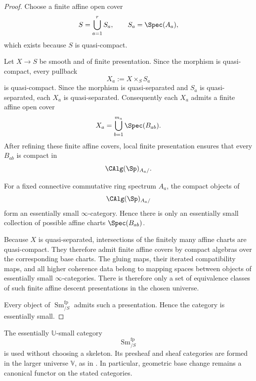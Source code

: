 \begin{proof}
Choose a finite affine open cover
\[
    S
    =
    \bigcup_{a=1}^r
    S_a,
    \qquad
    S_a=\Spec(A_a),
\]
which exists because $S$ is quasi-compact.

Let $X\to S$ be smooth and of finite presentation. Since the morphism is
quasi-compact, every pullback
\[
    X_a
    :=
    X\times_SS_a
\]
is quasi-compact. Since the morphism is quasi-separated and $S_a$ is
quasi-separated, each $X_a$ is quasi-separated. Consequently each $X_a$
admits a finite affine open cover
\[
    X_a
    =
    \bigcup_{b=1}^{m_a}
    \Spec(B_{ab}).
\]
After refining these finite affine covers, local finite presentation
ensures that every $B_{ab}$ is compact in
\[
    \CAlg(\Sp)_{A_a/}.
\]

For a fixed connective commutative ring spectrum $A_a$, the compact
objects of
\[
    \CAlg(\Sp)_{A_a/}
\]
form an essentially small $\infty$-category. Hence there is only an
essentially small collection of possible affine charts
$\Spec(B_{ab})$.

Because $X$ is quasi-separated, intersections of the finitely many affine
charts are quasi-compact. They therefore admit finite affine covers by
compact algebras over the corresponding base charts. The gluing maps,
their iterated compatibility maps, and all higher coherence data belong
to mapping spaces between objects of essentially small
$\infty$-categories. There is therefore only a set of equivalence classes
of such finite affine descent presentations in the chosen universe.

Every object of $\operatorname{Sm}^{\mathrm{fp}}_{/S}$ admits such a
presentation. Hence the category is essentially small.
\end{proof}

\begin{convention}
\label{conv:small-smooth-site}
The essentially $\mathbb U$-small category
\[
    \operatorname{Sm}^{\mathrm{fp}}_{/S}
\]
is used without choosing a skeleton. Its presheaf and sheaf categories are
formed in the larger universe $\mathbb V$, as in
. In particular, geometric base change remains
a canonical functor on the stated categories.
\end{convention}

